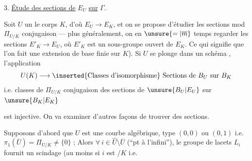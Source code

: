 3. \uline{Étude des sections de} $E_U$ \uline{sur} $\Gamma$.

Soit $U$ un   le corps $K$, d'où $E_U\longrightarrow E_K$, et on se propose d'étudier les sections mod $\Pi_{U/K}$ conjugaison --- plus généralement, on  en $\unsure{=|\overline m}$ temps regarder les sections $E'_K\longrightarrow E_U$, où $E'_K$ est un sous-groupe ouvert de $E_K$. Ce qui signifie que l'on fait une extension de base finie sur $K$). Si  $U$ se plonge dans un schéma  , l'application
\[
U(K)\longrightarrow \inserted{\text{Classes d'isomorphisme}}\ \text{Sections de }B_U\text{ sur }B_K
\]
i.e. classes de $\Pi_{U/K}$ conjugaison des sections de $\unsure{B_U|E_U}$ sur $\unsure{B_K|E_K}$

est injective. On va examiner d'autres façons  de trouver des sections.

Supposons d'abord que $U$ est une courbe algébrique,   type $(0,0)$ ou $(0,1)$ i.e. $\pi_1(\bar U)=\Pi_{U/K}\ne\{0\}$ ; Alors  $\forall\ i\in\widehat U\setminus\bar U$ (``pt à l'infini''), le groupe de lacets $L_i$ fournit un scindage (au moins si $i$ est $/K$ i.e. 

